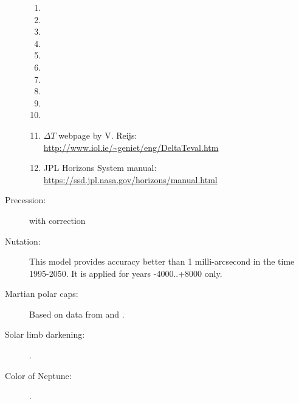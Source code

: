\begin{description}
\begin{enumerate}
		\item {}%
		\item {}%
		\item {} %
		\item {} %
		\item {} %
		\item {} %
		\item {}  %
		\item {} %
		\item {} %
		\item {} %
		\item $\Delta T$ webpage by V. Reijs: \url{http://www.iol.ie/~geniet/eng/DeltaTeval.htm}
		\item JPL Horizons System manual: \url{https://ssd.jpl.nasa.gov/horizons/manual.html}
		\end{enumerate}
	\item[Precession:]  with correction \citep{2012AA:Vondrak} 
	\item[Nutation:]    %
		This model provides accuracy better than 1 milli-arcsecond in the
		time 1995-2050. It is applied for years -4000..+8000 only.
	\item[Martian polar caps:] Based on data from \citet{MarsPoles:2009} and \citet{MarsRotation:2015}.
	\item[Solar limb darkening:] \citet{LimbDarkening:2002}.	
	\item[Color of Neptune:] \citet{UranusNeptuneColor:2024}.
\end{description}		
		

